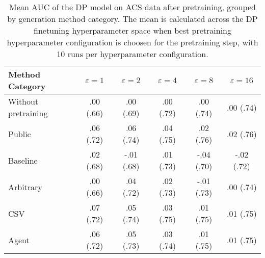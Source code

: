 \begin{table}[h!]
    \centering
    \caption{Mean AUC of the DP model on ACS data after pretraining, grouped by generation method category. The mean is calculated across the DP finetuning hyperparameter space when best pretraining hyperparameter configuration is choosen for the pretraining step, with 10 runs per hyperparameter configuration.}
    \label{tab:epsilon_comparison}
    \begin{tabular}{lccccc}
    \toprule
    Method Category & $\varepsilon=1$ & $\varepsilon=2$ & $\varepsilon=4$ & $\varepsilon=8$ & $\varepsilon=16$ \\
    \midrule
    Without pretraining & .00 {\small (.66)} & .00 {\small (.69)} & .00 {\small (.72)} & .00 {\small (.74)} & .00 {\small (.74)} \\
    \arrayrulecolor{black!50!}\midrule
    Public & \cellcolor{silver!30}.06 {\small (.72)} & \cellcolor{gold!30}.06 {\small (.74)} & \cellcolor{gold!30}.04 {\small (.75)} & \cellcolor{gold!30}.02 {\small (.76)} & \cellcolor{gold!30}.02 {\small (.76)} \\
    \arrayrulecolor{black!50!}\midrule
    Baseline & .02 {\small (.68)} & -.01 {\small (.68)} & .01 {\small (.73)} & -.04 {\small (.70)} & -.02 {\small (.72)} \\
    \arrayrulecolor{black!50!}\midrule
    Arbitrary & .00 {\small (.66)} & .04 {\small (.72)} & .02 {\small (.73)} & -.01 {\small (.73)} & .00 {\small (.74)} \\
    \arrayrulecolor{black!50!}\midrule
    CSV & \cellcolor{gold!30}.07 {\small (.72)} & \cellcolor{silver!30}.05 {\small (.74)} & \cellcolor{silver!30}.03 {\small (.75)} & \cellcolor{silver!30}.01 {\small (.75)} & \cellcolor{silver!30}.01 {\small (.75)} \\
    Agent & \cellcolor{bronze!30}.06 {\small (.72)} & \cellcolor{bronze!30}.05 {\small (.73)} & \cellcolor{bronze!30}.03 {\small (.74)} & \cellcolor{bronze!30}.01 {\small (.75)} & \cellcolor{bronze!30}.01 {\small (.75)} \\
    \bottomrule
    \end{tabular}
\end{table}